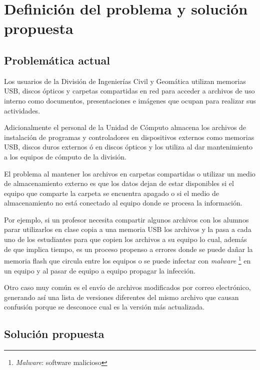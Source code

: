 {
  \linespread{1}
  \cleardoublepage  
  \chapter{Definici\'{o}n del problema y soluci\'{o}n propuesta}
  \label{chap:cap2}
}

    \section {Problem\'{a}tica actual}

Los usuarios de la Divisi\'{o}n de Ingenier\'{i}as Civil y Geom\'{a}tica utilizan memorias \textsc{USB}, discos \'{o}pticos y carpetas compartidas en red para acceder a archivos de uso interno como documentos, presentaciones e im\'{a}genes que ocupan para realizar sus actividades.

Adicionalmente el personal de la Unidad de C\'{o}mputo almacena los archivos de instalaci\'{o}n de programas y controladores en dispositivos externos como memorias \textsc{USB}, discos duros externos \'{o} en discos \'{o}pticos y los utiliza al dar mantenimiento a los equipos de c\'{o}mputo de la divisi\'{o}n.

El problema al mantener los archivos en carpetas compartidas o utilizar un medio de almacenamiento externo es que los datos dejan de estar disponibles si el equipo que comparte la carpeta se encuentra apagado o si el medio de almacenamiento no est\'{a} conectado al equipo donde se procesa la informaci\'{o}n.

Por ejemplo, si un profesor necesita compartir algunos archivos con los alumnos parar utilizarlos en clase copia a una memoria \textsc{USB} los archivos y la pasa a cada uno de los estudiantes para que copien los archivos a su equipo lo cual, adem\'{a}s de que implica tiempo, es un proceso propenso a errores donde se puede da\~{n}ar la memoria flash que circula entre los equipos o se puede infectar con \textit{malware} \footnote{\textit{Malware}: software malicioso} en un equipo y al pasar de equipo a equipo propagar la infecci\'{o}n.

Otro caso muy com\'{u}n es el env\'{i}o de archivos modificados por correo electr\'{o}nico, generando as\'{i} una lista de versiones diferentes del mismo archivo que causan confusi\'{o}n porque se desconoce cual es la versi\'{o}n m\'{a}s actualizada.

    \section {Soluci\'{o}n propuesta}

